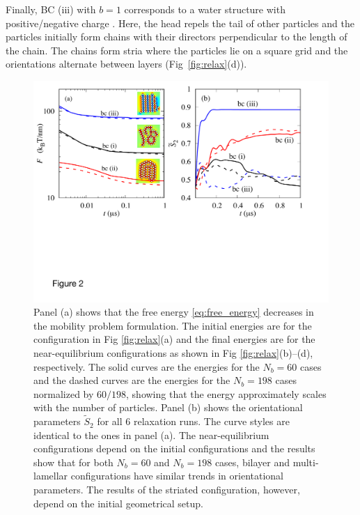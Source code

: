 \documentclass[prb,preprint,showpacs,preprintnumbers,amsmath,amssymb,longbibliography]{revtex4-1}
\begin{document}
Finally, BC (iii) with $b=1$ 
corresponds to a water structure with
positive/negative charge \cite{MaRa76, Ma77}.
Here, the head repels the tail of other particles
and the particles initially form chains with their directors perpendicular
to the length of the chain.  
The chains form stria
where the particles lie on a 
square grid and the orientations alternate
between layers (Fig~\ref{fig:relax}(d)).

\begin{figure}
  \begin{center}
\includegraphics[width=1.0\textwidth]{Figures/Figure2.pdf}
  \end{center}
  \vspace{-20pt}  
  \caption{\label{fig:relax_energy}
  Panel (a) shows that the free energy \eqref{eq:free_energy} decreases
    in the mobility problem formulation.  The initial energies
    are for the configuration in Fig \ref{fig:relax}(a)
    and the final energies are for the near-equilibrium
    configurations as shown in Fig \ref{fig:relax}(b)--(d), respectively.
    The solid curves are the energies for the $N_b=60$ cases and  
    the dashed curves are the energies for the $N_b = 198$ cases normalized
    by $60/198$, showing that the energy approximately scales with the number of
    particles. 
    Panel (b) shows the orientational parameters $\tilde{S}_2$ for all 6 relaxation runs. 
    The curve styles are identical to the ones in panel (a).
    The near-equilibrium configurations depend on the initial configurations and the results show that for both $N_b=60$ and $N_b=198$ cases, bilayer and multi-lamellar configurations have similar trends in orientational parameters.
    The results of the striated configuration, however, depend on the initial geometrical setup.
  }
\end{figure}
\end{document}

